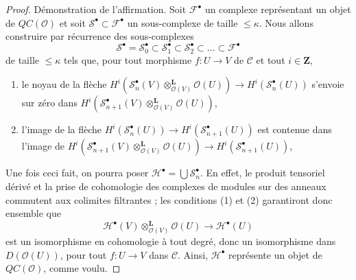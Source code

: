 \begin{proof}
\medskip\noindent
Démonstration de l'affirmation. Soit $\mathcal{F}^\bullet$ un complexe
représentant un objet de $\mathit{QC}(\mathcal{O})$ et soit
$\mathcal{S}^\bullet \subset \mathcal{F}^\bullet$ un sous-complexe de taille
$\leq \kappa$. Nous allons construire par récurrence des sous-complexes
$$
\mathcal{S}^\bullet = \mathcal{S}_0^\bullet \subset
\mathcal{S}_1^\bullet \subset
\mathcal{S}_2^\bullet \subset \ldots \subset \mathcal{F}^\bullet
$$
de taille $\leq \kappa$ tels que, pour tout morphisme $f : U \to V$ de
$\mathcal{C}$ et tout $i \in \mathbf{Z}$,
\begin{enumerate}
\item le noyau de la flèche
$H^i(\mathcal{S}_n^\bullet(V)
\otimes_{\mathcal{O}(V)}^\mathbf{L} \mathcal{O}(U)) \to
H^i(\mathcal{S}_n^\bullet(U))$
s'envoie sur zéro dans
$H^i(\mathcal{S}_{n + 1}^\bullet(V)
\otimes_{\mathcal{O}(V)}^\mathbf{L} \mathcal{O}(U))$,
\item l'image de la flèche
$H^i(\mathcal{S}_n^\bullet(U)) \to H^i(\mathcal{S}_{n + 1}^\bullet(U))$
est contenue dans l'image de
$H^i(\mathcal{S}_{n + 1}^\bullet(V)
\otimes_{\mathcal{O}(V)}^\mathbf{L} \mathcal{O}(U)) \to
H^i(\mathcal{S}_{n + 1}^\bullet(U))$,
\end{enumerate}
Une fois ceci fait, on pourra poser
$\mathcal{H}^\bullet = \bigcup \mathcal{S}_n^\bullet$. En effet, le produit
tensoriel dérivé et la prise de cohomologie des complexes de modules sur des
anneaux commutent aux colimites filtrantes ; les conditions (1) et (2)
garantiront donc ensemble que
$$
\mathcal{H}^\bullet(V) \otimes_{\mathcal{O}(V)}^\mathbf{L} \mathcal{O}(U)
\longrightarrow
\mathcal{H}^\bullet(U)
$$
est un isomorphisme en cohomologie à tout degré, donc un isomorphisme dans
$D(\mathcal{O}(U))$, pour tout $f : U \to V$ dans $\mathcal{C}$. Ainsi,
$\mathcal{H}^\bullet$ représente un objet de $\mathit{QC}(\mathcal{O})$,
comme voulu.


\end{proof}
